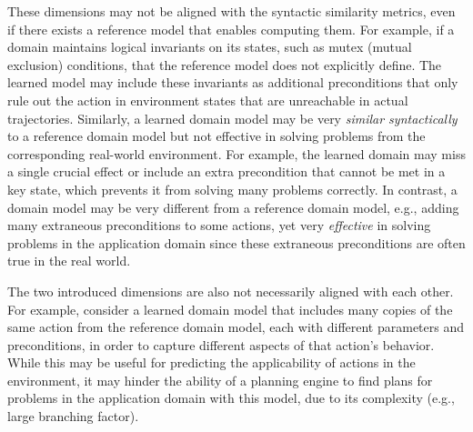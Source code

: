 \documentclass[letterpaper]{article} %
\newif\ifaddcomments
\newcommand{\roni}[1]{\ifaddcomments{\textcolor{red}{[Roni: #1]}}\fi}
\newcommand{\yarin}[1]{\ifaddcomments{\textcolor{teal}{[Yarin: #1]}}\fi}
\newcommand{\gregor}[1]{\ifaddcomments{\textcolor{orange}{[Gregor: #1]}}\fi}
\begin{document}
These dimensions may not be aligned with the syntactic similarity metrics, even if there exists a reference model that enables computing them.  
For example, if a domain maintains logical invariants on its states, such as mutex (mutual exclusion) conditions, that the reference model does not explicitly define. The learned model may include these invariants as additional preconditions that only rule out the action in environment states that are unreachable in actual trajectories.
Similarly, a learned domain model may be very \emph{similar syntactically} to a reference domain model but not effective in solving problems from the corresponding real-world environment. 
For example, the learned domain may miss a single crucial effect or include an extra precondition that cannot be met in a key state, which prevents it from solving many problems correctly. 
In contrast, a domain model may be very different from a reference domain model, e.g., adding many extraneous preconditions to some actions, yet very \emph{effective} in solving problems in the application domain since these extraneous preconditions are often true in the real world. 


The two introduced dimensions are also not necessarily aligned with each other. %
For example, consider a learned domain model that includes many copies of the same action from the reference domain model, each with different parameters and preconditions, in order to capture different aspects of that action's behavior. 
While this may be useful for predicting the applicability of actions in the environment, 
it may hinder the ability of a planning engine to find plans for problems in the application domain with this model, due to its complexity (e.g., large branching factor). 
\end{document}
